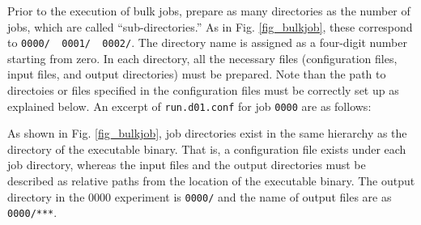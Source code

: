 Prior to the execution of bulk jobs, prepare as many directories as the number of jobs, which are called ``sub-directories.'' As in Fig. \ref{fig_bulkjob}, these correspond to \verb|0000/  0001/  0002/|. The directory name is assigned as a four-digit number starting from zero. In each directory, all the necessary files (configuration files, input files, and output directories) must be prepared.
Note than the path to directoies or files specified in the configuration files must be correctly set up as explained below.
An excerpt of \verb|run.d01.conf| for job \verb|0000| are as follows:

As shown in Fig. \ref{fig_bulkjob}, job directories exist in the same hierarchy as the directory of the executable binary. That is, a configuration file exists under each job directory, whereas the input files and the output directories must be described as relative paths from the location of  the executable binary. The output directory in the 0000 experiment is \verb|0000/| and the name of output files are as \verb|0000/***|. {\color{blue}{ Note that when the file name is common to all experiments without job directory settings, the output is written to the same file, and the data disappear as a result.
}}


